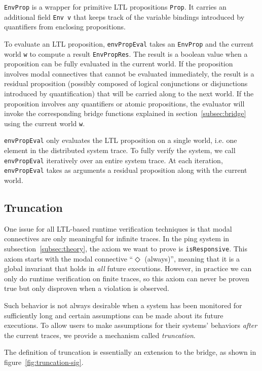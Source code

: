\documentclass[format=acmsmall, nonacm=true, review=true, screen=true]{acmart}
\begin{document}
\texttt{EnvProp} is a wrapper for primitive LTL propositions \texttt{Prop}.
It carries an additional field \texttt{Env v} that keeps track of the variable bindings introduced by quantifiers from enclosing propositions.

To evaluate an LTL proposition, \texttt{envPropEval} takes an \texttt{EnvProp} and the current world \texttt{w} to compute a result \texttt{EnvPropRes}.
The result is a boolean value when a proposition can be fully evaluated in the current world.
If the proposition involves modal connectives that cannot be evaluated immediately, the result is a residual proposition (possibly composed of logical conjunctions or disjunctions introduced by quantification) that will be carried along to the next world.
If the proposition involves any quantifiers or atomic propositions, the evaluator will invoke the corresponding bridge functions explained in section~\ref{subsec:bridge} using the current world \texttt{w}.

\texttt{envPropEval} only evaluates the LTL proposition on a single world, i.e. one element in the distributed system trace.
To fully verify the system, we call \texttt{envPropEval} iteratively over an entire system trace.
At each iteration, \texttt{envPropEval} takes as arguments a residual proposition along with the current world.

\subsection{Truncation}

One issue for all LTL-based runtime verification techniques is that modal connectives are only meaningful for infinite traces.
In the ping system in subsection~\ref{subsec:theory}, the axiom we want to prove is \texttt{isResponsive}.
This axiom starts with the modal connective ``$\Diamond$ (always)'', meaning that it is a global invariant that holds in \textit{all} future executions.
However, in practice we can only do runtime verification on finite traces, so this axiom can never be proven true but only disproven when a violation is observed.

Such behavior is not always desirable when a system has been monitored for sufficiently long and certain assumptions can be made about its future executions.
To allow users to make assumptions for their systems' behaviors \textit{after} the current traces, we provide a mechanism called \textit{truncation}.

The definition of truncation is essentially an extension to the bridge, as shown in figure~\ref{fig:truncation-sig}.
\end{document}
